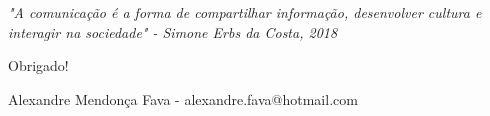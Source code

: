 \documentclass{Alexandre}
\begin{document}
\begin{frame}
    \begin{center}
        \textit{"A comunicação é a forma de compartilhar informação, desenvolver cultura e interagir na sociedade" - Simone Erbs da Costa, 2018}\\
        \vspace{1.5cm}
        \begin{Huge} 
            Obrigado!\\
        \end{Huge}
        \bigskip
        Alexandre Mendonça Fava - \alert{alexandre.fava@hotmail.com}\\
    \end{center}
\end{frame}
\end{document}

